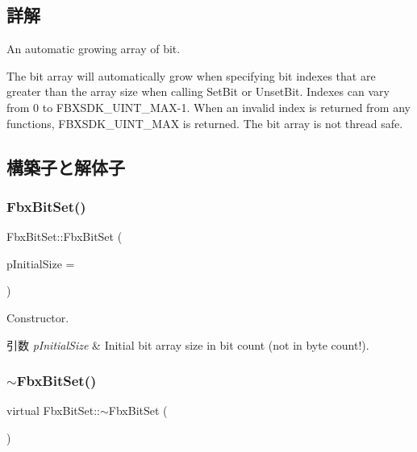 \subsection{詳解}
An automatic growing array of bit.

The bit array will automatically grow when specifying bit indexes that are greater than the array size when calling Set\+Bit or Unset\+Bit. Indexes can vary from 0 to F\+B\+X\+S\+D\+K\+\_\+\+U\+I\+N\+T\+\_\+\+M\+A\+X-\/1. When an invalid index is returned from any functions, F\+B\+X\+S\+D\+K\+\_\+\+U\+I\+N\+T\+\_\+\+M\+AX is returned. The bit array is not thread safe. 

\subsection{構築子と解体子}
\mbox{\label{class_fbx_bit_set_ad2f5e43f377d1382c847befddb386710}} 
\subsubsection{\texorpdfstring{Fbx\+Bit\+Set()}{FbxBitSet()}}
{\footnotesize\ttfamily Fbx\+Bit\+Set\+::\+Fbx\+Bit\+Set (\begin{DoxyParamCaption}\item[{const \hyperlink{fbxtypes_8h_ae9fb141d8158a730aa85ec5ff2ea3f6b}{Fbx\+U\+Int}}]{p\+Initial\+Size = {} }\end{DoxyParamCaption})}

Constructor. 
\begin{DoxyParams}{引数}
{\em p\+Initial\+Size} & Initial bit array size in bit count (not in byte count!). \\
\hline
\end{DoxyParams}
\mbox{\label{class_fbx_bit_set_af1b946280a865ffe296f72d0a7648c18}} 
\subsubsection{\texorpdfstring{$\sim$\+Fbx\+Bit\+Set()}{~FbxBitSet()}}
{\footnotesize\ttfamily virtual Fbx\+Bit\+Set\+::$\sim$\+Fbx\+Bit\+Set (\begin{DoxyParamCaption}{ }\end{DoxyParamCaption})\hspace{0.3cm}{\ttfamily [virtual]}}



